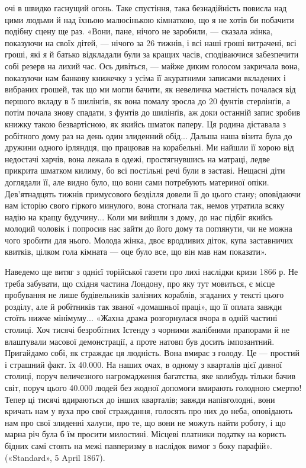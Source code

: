 \parcont{}  %
очі в швидко гаснущий огонь. Таке спустіння, така безнадійність
повисла над цими людьми й над їхньою малюсінькою кімнаткою,
що я не хотів би побачити подібну сцену ще раз. «Вони,
пане, нічого не заробили, — сказала жінка, показуючи на своїх
дітей, — нічого за 26 тижнів, і всі наші гроші витрачені, всі гроші,
які я й батько відкладали були за кращих часів, сподіваючися
забезпечити собі резерв на лихий час. Ось дивіться, — майже
диким голосом закричала вона, показуючи нам банкову книжечку
з усіма її акуратними записами вкладених і вибраних грошей,
так що ми могли бачити, як невеличка маєтність почалася
від першого вкладу в 5 шилінґів, як вона помалу зросла до
20 фунтів стерлінґів, а потім почала знову спадати, з фунтів до
шилінґів, аж доки останній запис зробив книжку такою безвартісною,
як якийсь шматок паперу. Ця родина діставала з робітного
дому раз на день один злиденний обід... Дальша наша візита
була до дружини одного ірляндця, що працював на корабельні.
Ми найшли її хорою від недостачі харчів, вона лежала в одежі,
простягнувшись на матраці, ледве прикрита шматком килиму,
бо всі постільні речі були в заставі. Нещасні діти доглядали її,
але видно було, що вони сами потребують материної опіки.
Дев’ятнадцять тижнів примусового безділля довели її до цього
стану; оповідаючи нам історію свого гіркого минулого, вона
стогнала так, немов утратила всяку надію на кращу будучину...
Коли ми вийшли з дому, до нас підбіг якийсь молодий чоловік
і попросив нас зайти до його дому та поглянути, чи не можна
чого зробити для нього. Молода жінка, двоє вродливих діток,
купа заставничих квитків, цілком гола кімната — оце було все,
що він мав нам показати».

Наведемо ще витяг з однієї торійської газети про лихі наслідки
кризи 1866 р. Не треба забувати, що східня частина Лондону,
про яку тут мовиться, є місце пробування не лише будівельників
залізних кораблів, згаданих у тексті цього розділу, але й
робітників так званої «домашньої праці», що її оплата завжди
стоїть нижче мінімуму... «Жахна драма розгорнулася вчора в
одній частині столиці. Хоч тисячі безробітних Істенду з чорними
жалібними прапорами й не влаштували масової демонстрації,
а проте натовп був досить імпозантний. Пригайдамо собі, як
страждає ця людність. Вона вмирає з голоду. Це — простий і
страшний факт. їх 40.000. На наших очах, в одному з кварталів
цієї дивної столиці, поруч величезного нагромадження багатства,
яке колибудь тільки бачив світ, поруч цього 40.000 людей без
жодної допомоги вмирають голодною смертю! Тепер ці тисячі
вдираються до інших кварталів; завжди напівголодні, вони кричать
нам у вуха про свої страждання, голосять про них до
неба, оповідають нам про свої злиденні халупи, про те, що вони
не можуть найти роботу, і що марна річ була б їм просити
милостині. Місцеві платники податку на користь бідних самі
стоять на межі павперизму в наслідок вимог з боку парафій».
(«Standard», 5 April 1867).
